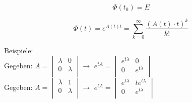 \begin{equation*}
\Phi(t_0) = E
\end{equation*}

\begin{equation*}
\Phi(t) = e^{A(t)t} =\sum_{k=0}^{\infty}\frac{(A(t)\cdot t)^k}{k!}
\end{equation*}

Beispiele:\\
Gegeben: $A = 	\begin{vmatrix} 
	        		\lambda & 0\\ 
	        		0 & \lambda\\   
				\end{vmatrix} 
				\rightarrow$ 
$e^{tA} = \begin{vmatrix} 
	        		e^{t\lambda} & 0\\ 
	        		0 & e^{t\lambda}\\   
				\end{vmatrix}$\\
Gegeben: $A = 	\begin{vmatrix} 
	        		\lambda & 1\\ 
	        		0 & \lambda\\   
				\end{vmatrix} 
				\rightarrow$ 
$e^{tA} = \begin{vmatrix} 
	        		e^{t\lambda} & te^{t\lambda}\\ 
	        		0 & e^{t\lambda}\\   
				\end{vmatrix}$\\
				
